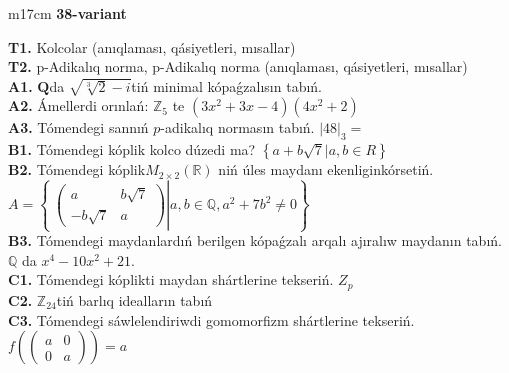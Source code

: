 \documentclass{article}
\begin{document}
\begin{tabular}{m{17cm}}
\textbf{38-variant}
\newline

\textbf{T1.} Kolcolar (anıqlaması, qásiyetleri, mısallar) \\
\textbf{T2.} p-Adikalıq norma, p-Adikalıq norma (anıqlaması, qásiyetleri, mısallar) \\
\textbf{A1.} \(\mathbf{Q}\)da \(\sqrt{\sqrt[3]{2} - i}\)tiń minimal kópaǵzalısın tabıń. \\
\textbf{A2.} Ámellerdi orınlań: \(\mathbb{Z}_{5}\) te \(\left( 3x^{2} + 3x - 4 \right)\left( 4x^{2} + 2 \right)\) \\
\textbf{A3.} Tómendegi sannıń \(p\)-adikalıq normasın tabıń. \(|48|_{3} =\) \\
\textbf{B1.} Tómendegi kóplik kolco dúzedi ma? \(\left\{ a + b\sqrt{7}|a,b \in R \right\}\) \\
\textbf{B2.} Tómendegi kóplik\(M_{2 \times 2}\left( \mathbb{R} \right)\) niń úles maydanı ekenliginkórsetiń. \(A = \left\{ \left. \ \begin{pmatrix}
a & b\sqrt{7} \\
 - b\sqrt{7} & a
\end{pmatrix} \right|a,b\mathbb{\in Q},a^{2} + 7b^{2} \neq 0 \right\}\) \\
\textbf{B3.} Tómendegi maydanlardıń berilgen kópaǵzalı arqalı ajıralıw maydanın tabıń. \(\mathbb{Q}\) da \(x^{4} - 10x^{2} + 21\). \\
\textbf{C1.} Tómendegi kóplikti maydan shártlerine tekseriń. \(Z_{p}\) \\
\textbf{C2.} \(\mathbb{Z}_{24}\)tiń barlıq idealların tabıń \\
\textbf{C3.} Tómendegi sáwlelendiriwdi gomomorfizm shártlerine tekseriń. \(f\left( \begin{pmatrix}
a & 0 \\
0 & a
\end{pmatrix} \right) = a\) \\

\end{tabular}
\vspace{1cm}
\end{document}
